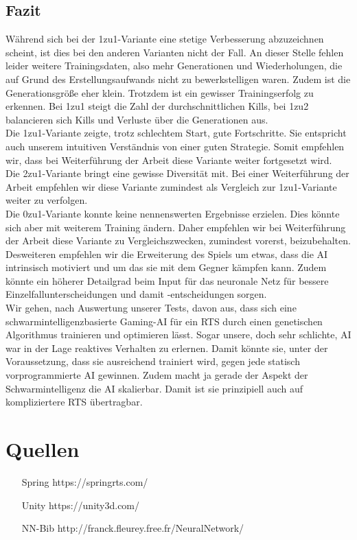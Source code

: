\documentclass[
	12pt,
	a4paper,
	BCOR10mm,
	DIV14,
	headsepline,
	usegeometry,
]{scrreprt}
\begin{document}
\section{Fazit}
Während sich bei der 1zu1-Variante eine stetige Verbesserung abzuzeichnen scheint, ist dies bei den anderen Varianten nicht der Fall. An dieser Stelle fehlen leider weitere Trainingsdaten, also mehr Generationen und Wiederholungen, die auf Grund des Erstellungsaufwands nicht zu bewerkstelligen waren. Zudem ist die Generationsgröße eher klein. Trotzdem ist ein gewisser Trainingserfolg zu erkennen. Bei 1zu1 steigt die Zahl der durchschnittlichen Kills, bei 1zu2 balancieren sich Kills und Verluste über die Generationen aus.\\
Die 1zu1-Variante zeigte, trotz schlechtem Start, gute Fortschritte. Sie entspricht auch unserem intuitiven Verständnis von einer guten Strategie. Somit empfehlen wir, dass bei Weiterführung der Arbeit diese Variante weiter fortgesetzt wird.\\
Die 2zu1-Variante bringt eine gewisse Diversität mit. Bei einer Weiterführung der Arbeit empfehlen wir diese Variante zumindest als Vergleich zur 1zu1-Variante weiter zu verfolgen.\\
Die 0zu1-Variante konnte keine nennenswerten Ergebnisse erzielen. Dies könnte sich aber mit weiterem Training ändern. Daher empfehlen wir bei Weiterführung der Arbeit diese Variante zu Vergleichszwecken, zumindest vorerst, beizubehalten.\\
Desweiteren empfehlen wir die Erweiterung des Spiels um etwas, dass die AI intrinsisch motiviert und um das sie mit dem Gegner kämpfen kann. Zudem könnte ein höherer Detailgrad beim Input für das neuronale Netz für bessere Einzelfallunterscheidungen und damit -entscheidungen sorgen.\\
Wir gehen, nach Auswertung unserer Tests, davon aus, dass sich eine schwarmintelligenzbasierte Gaming-AI für ein RTS durch einen genetischen Algorithmus trainieren und optimieren lässt. Sogar unsere, doch sehr schlichte, AI war in der Lage reaktives Verhalten zu erlernen. Damit könnte sie, unter der Voraussetzung, dass sie ausreichend trainiert wird, gegen jede statisch vorprogrammierte AI gewinnen. Zudem macht ja gerade der Aspekt der Schwarmintelligenz die AI skalierbar. Damit ist sie prinzipiell auch auf kompliziertere RTS übertragbar.





\appendix
\appendixpage

\chapter{Quellen}

\begin{itemize}
	\item[Spring] https://springrts.com/
	\item[Unity] https://unity3d.com/
	\item[NN-Bib] http://franck.fleurey.free.fr/NeuralNetwork/
\end{itemize}

\listoffigures
\end{document}
